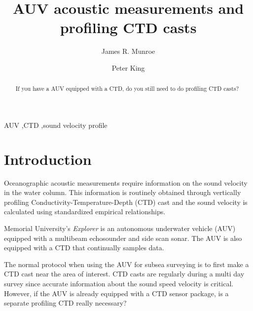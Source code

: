 \documentclass[preprint,12pt,3p]{elsarticle}
\begin{document}
\begin{frontmatter}


\title{ AUV acoustic measurements and profiling CTD casts}

\author[label1]{James R. Munroe}
\address[label1]{Physics and Physical Oceanography, Memorial University of Newfoundland}

\author[label2]{Peter King}
\address[label2]{Faculty of Engineering, Memorial University of Newfoundland}

\begin{abstract}
If you have a AUV equipped with a CTD, do you still need to do profiling CTD casts?
\end{abstract}

\begin{keyword}
AUV \sep CTD \sep sound velocity profile
\end{keyword}

\end{frontmatter}



\section{Introduction}
\label{sec:Introduction}

Oceanographic acoustic measurements require information on the sound velocity in the water column.  This information is routinely obtained through vertically profiling Conductivity-Temperature-Depth (CTD) cast and the sound velocity is calculated using standardized empirical relationships.

Memorial University's \textit{Explorer} is an autonomous underwater vehicle (AUV) equipped with a multibeam echosounder and side scan sonar. The AUV is also equipped with a CTD that continually samples data.

The normal protocol when using the AUV for subsea surveying is to first make a CTD cast near the area of interest. CTD casts are regularly during a multi day survey since accurate information about the sound speed velocity is critical.  However, if the AUV is already equipped with a CTD sensor package, is a separate profiling CTD really necessary?  
\end{document}
